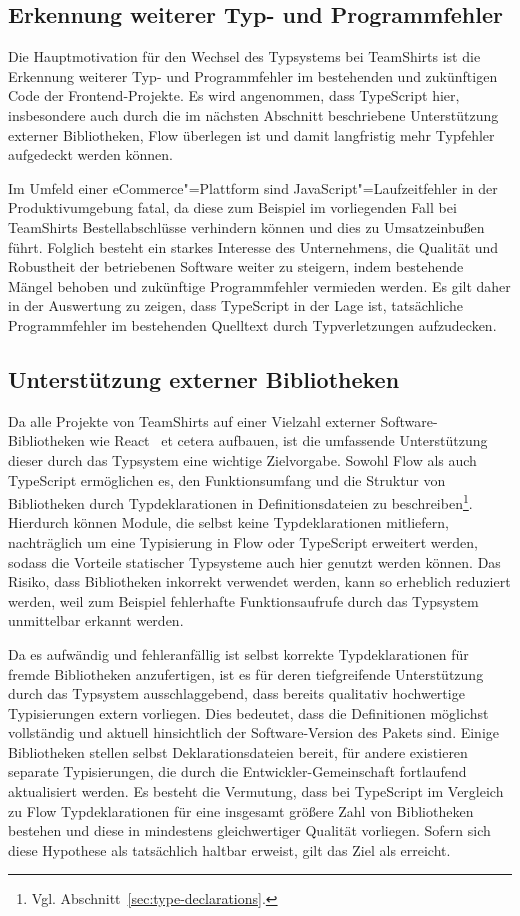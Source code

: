 \subsection{Erkennung weiterer Typ- und Programmfehler}

Die Hauptmotivation für den Wechsel des Typsystems bei TeamShirts ist die Erkennung weiterer Typ- und Programmfehler im bestehenden und zukünftigen Code der Frontend-Projekte. Es wird angenommen, dass TypeScript hier, insbesondere auch durch die im nächsten Abschnitt beschriebene Unterstützung externer Bibliotheken, Flow überlegen ist und damit langfristig mehr Typfehler aufgedeckt werden können.

Im Umfeld einer eCommerce"=Plattform sind JavaScript"=Laufzeitfehler in der Produktivumgebung fatal, da diese zum Beispiel im vorliegenden Fall bei TeamShirts Bestellabschlüsse verhindern können und dies zu Umsatzeinbußen führt. Folglich besteht ein starkes Interesse des Unternehmens, die Qualität und Robustheit der betriebenen Software weiter zu steigern, indem bestehende Mängel behoben und zukünftige Programmfehler vermieden werden. Es gilt daher in der Auswertung zu zeigen, dass TypeScript in der Lage ist, tatsächliche Programmfehler im bestehenden Quelltext durch Typverletzungen aufzudecken.

\subsection{Unterstützung externer Bibliotheken}

Da alle Projekte von TeamShirts auf einer Vielzahl externer Software-Bibliotheken wie React~\autocite{SOFTWARE:REACT} et cetera aufbauen, ist die umfassende Unterstützung dieser durch das Typsystem eine wichtige Zielvorgabe. Sowohl Flow als auch TypeScript ermöglichen es, den Funktionsumfang und die Struktur von Bibliotheken durch Typdeklarationen in Definitionsdateien zu beschreiben\footnote{Vgl. Abschnitt~\ref{sec:type-declarations}.}. Hierdurch können Module, die selbst keine Typdeklarationen mitliefern, nachträglich um eine Typisierung in Flow oder TypeScript erweitert werden, sodass die Vorteile statischer Typsysteme auch hier genutzt werden können. Das Risiko, dass Bibliotheken inkorrekt verwendet werden, kann so erheblich reduziert werden, weil zum Beispiel fehlerhafte Funktionsaufrufe durch das Typsystem unmittelbar erkannt werden.

Da es aufwändig und fehleranfällig ist selbst korrekte Typdeklarationen für fremde Bibliotheken anzufertigen, ist es für deren tiefgreifende Unterstützung durch das Typsystem ausschlaggebend, dass bereits qualitativ hochwertige Typisierungen extern vorliegen. Dies bedeutet, dass die Definitionen möglichst vollständig und aktuell hinsichtlich der Software-Version des Pakets sind. Einige Bibliotheken stellen selbst Deklarationsdateien bereit, für andere existieren separate Typisierungen, die durch die Entwickler-Gemeinschaft fortlaufend aktualisiert werden. Es besteht die Vermutung, dass bei TypeScript im Vergleich zu Flow Typdeklarationen für eine insgesamt größere Zahl von Bibliotheken bestehen und diese in mindestens gleichwertiger Qualität vorliegen. Sofern sich diese Hypothese als tatsächlich haltbar erweist, gilt das Ziel als erreicht.

